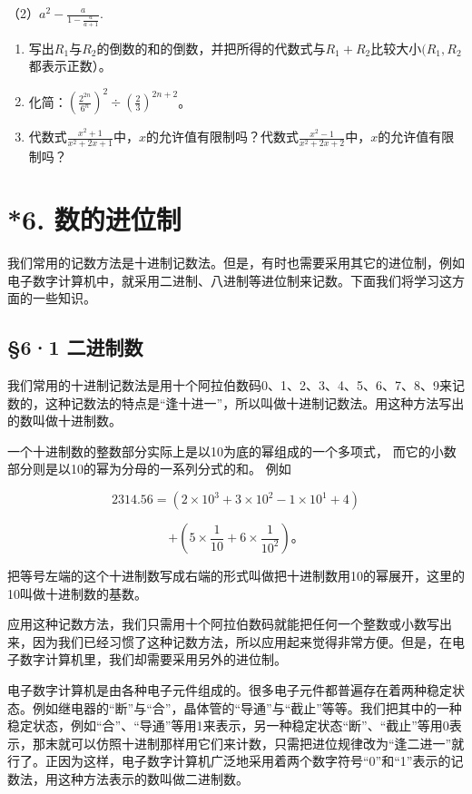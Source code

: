 （2）\(a^2 - \frac{a}{1 - \frac{a}{a + 1}}.\)

\begin{enumerate}[start=9]
\item
  写出\(R_{1}\)与\(R_{2}\)的倒数的和的倒数，并把所得的代数式与\(R_{1} + R_{2}\)比较大小\((R_{1}, R_{2}\)都表示正数）。
\item
  化简：\(\left(\frac{2^{2n}}{6^n}\right)^2 \div \left(\frac{2}{3}\right)^{2n + 2}\)。
\item
  代数式\(\frac{x^2 + 1}{x^2 + 2x + 1}\)中，\(x\)的允许值有限制吗？代数式\(\frac{x^2 - 1}{x^2 + 2x + 2}\)中，\(x\)的允许值有限制吗？
\end{enumerate}

\chapter{*6. 数的进位制}

我们常用的记数方法是十进制记数法。但是，有时也需要采用其它的进位制，例如电子数字计算机中，就采用二进制、八进制等进位制来记数。下面我们将学习这方面的一些知识。

\section{§6·1 二进制数}

我们常用的十进制记数法是用十个阿拉伯数码0、1、2、3、4、5、6、7、8、9来记数的，这种记数法的特点是``逢十进一''，所以叫做十进制记数法。用这种方法写出的数叫做十进制数。

一个十进制数的整数部分实际上是以10为底的幂组成的一个多项式，
而它的小数部分则是以10的幂为分母的一系列分式的和。 例如

\[
2314.56 = (2 \times 10 ^{3} + 3 \times 10 ^{2} - 1 \times 10 ^{1} + 4)
\]

\[
+ \left(5 \times \frac{1}{10} + 6 \times \frac{1}{10 ^{2}}\right)\text{。}
\]

把等号左端的这个十进制数写成右端的形式叫做把十进制数用10的幂展开，这里的10叫做十进制数的基数。

应用这种记数方法，我们只需用十个阿拉伯数码就能把任何一个整数或小数写出来，因为我们已经习惯了这种记数方法，所以应用起来觉得非常方便。但是，在电子数字计算机里，我们却需要采用另外的进位制。

电子数字计算机是由各种电子元件组成的。很多电子元件都普遍存在着两种稳定状态。例如继电器的``断''与``合''，晶体管的``导通''与``截止''等等。我们把其中的一种稳定状态，例如``合''、``导通''等用1来表示，另一种稳定状态``断''、``截止''等用0表示，那末就可以仿照十进制那样用它们来计数，只需把进位规律改为``逢二进一''就行了。正因为这样，电子数字计算机广泛地采用着两个数字符号``0''和``1''表示的记数法，用这种方法表示的数叫做二进制数。

